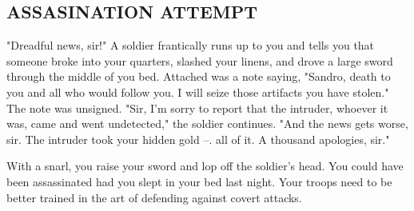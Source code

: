 \begin{multicols*}{2}
\subsection*{\MakeUppercase{Assasination attempt}}

"Dreadful news, sir!" A soldier frantically runs up to you and tells you that someone broke into your quarters, slashed your linens, and drove a large sword through the middle of you bed. Attached was a note saying, "Sandro, death to you and all who would follow you. I will seize those artifacts you have stolen." The note was unsigned.
"Sir, I'm sorry to report that the intruder, whoever it was, came and went undetected," the soldier continues. "And the news gets worse, sir. The intruder took your hidden gold --. all of it. A thousand apologies, sir."

With a snarl, you raise your sword and lop off the soldier's head. You could have been assassinated had you slept in your bed last night. Your troops need to be better trained in the art of defending against covert attacks.

\end{multicols*}
